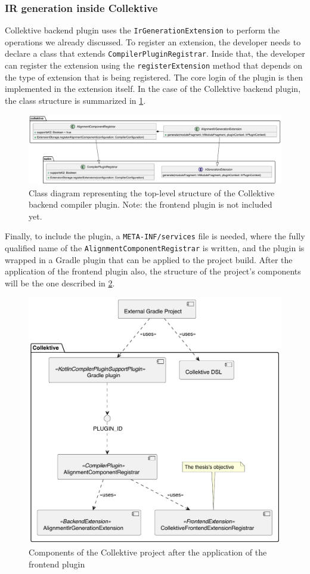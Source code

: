 \documentclass[12pt,a4paper,openright,twoside]{book}
\begin{document}
\subsubsection{IR generation inside Collektive} \label{sec:ir-generation-collektive}

Collektive backend plugin uses the \lstinline{IrGenerationExtension} to perform 
the operations we already discussed. To register an extension, the developer needs
to declare a class that extends \lstinline{CompilerPluginRegistrar}. Inside that,
the developer can register the extension using the \lstinline{registerExtension}
method that depends on the type of extension that is being registered. 
%
The core login of the plugin is then implemented in the extension itself. In the
case of the Collektive backend plugin, the class structure is summarized 
in \cref{fig:extensions-class-diagram}.

\begin{figure}
  \centering
  \includegraphics[width=.9\linewidth]{figures/extensions-class-diagram.pdf}
  \caption{Class diagram representing the top-level structure of the Collektive 
  backend compiler plugin. Note: the frontend plugin is not included yet.}
  \label{fig:extensions-class-diagram}
\end{figure}

Finally, to include the plugin, a \lstinline{META-INF/services} file is needed,
where the fully qualified name of the \lstinline{AlignmentComponentRegistrar} is
written, and the plugin is wrapped in a Gradle plugin that can be applied to the
project build. After the application of the frontend plugin also, the structure
of the project's components will be the one described in
\cref{fig:collektive-components-diagram}.

\begin{figure}
  \centering
  \includegraphics[width=.6\linewidth]{figures/collektive-components.pdf}
  \caption{Components of the Collektive project after the application of the frontend plugin}
  \label{fig:collektive-components-diagram}
\end{figure}
\end{document}
